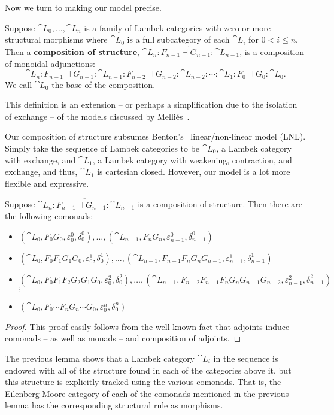 Now we turn to making our model precise.
\begin{definition}
  \label{def:model}  
  Suppose $\cat{L}_0, \ldots, \cat{L}_n$ is a family of Lambek
  categories with zero or more structural morphisms where $\cat{L}_0$
  is a full subcategory of each $\cat{L}_{i}$ for $0 < i \leq n$.  Then a \textbf{composition of structure},
  $\overleftarrow{\cat{L}_n : F_{n-1} \dashv G_{n-1} : \cat{L}_{n-1}}$, is a composition of monoidal adjunctions:
  \[ \cat{L}_n : F_{n-1} \dashv G_{n-1} : \cat{L}_{n-1} : F_{n-2} \dashv G_{n-2} : \cat{L}_{n-2} : \cdots : \cat{L}_1 : F_0 \dashv G_0 : \cat{L}_0. \]
  We call $\cat{L}_0$ the base of the composition.
\end{definition}
This definition is an extension -- or perhaps a simplification due to
the isolation of exchange -- of the models discussed by
Melli\'es~\cite{MELLIES2004202}.

Our composition of structure subsumes Benton's~\cite{Benton:1994}
linear/non-linear model (LNL).  Simply take the sequence of Lambek
categories to be $\cat{L}_0$, a Lambek category with exchange, and
$\cat{L}_1$, a Lambek category with weakening, contraction, and
exchange, and thus, $\cat{L}_1$ is cartesian closed.  However, our
model is a lot more flexible and expressive.

\begin{lemma}
  \label{lemma:comonads_in_a_composition_of_structure}
  Suppose $\overleftarrow{\cat{L}_n : F_{n-1} \dashv G_{n-1} : \cat{L}_{n-1}}$ is a composition of structure.  Then
  there are the following comonads:  
  \begin{itemize}
  \item $(\cat{L}_0, F_0G_0, \varepsilon^0_0, \delta^0_0), \ldots, (\cat{L}_{n-1}, F_nG_n, \varepsilon^0_{n-1}, \delta^0_{n-1})$
  \item $(\cat{L}_0, F_0F_1G_1G_0, \varepsilon^1_0, \delta^1_0), \ldots, (\cat{L}_{n-1}, F_{n-1}F_nG_nG_{n-1}, \varepsilon^1_{n-1}, \delta^1_{n-1})$
  \item $(\cat{L}_0, F_0F_1F_2G_2G_1G_0, \varepsilon^2_0, \delta^2_0), \ldots, (\cat{L}_{n-1}, F_{n-2}F_{n-1}F_nG_nG_{n-1}G_{n-2}, \varepsilon^2_{n-1}, \delta^2_{n-1})$\\
    $\vdots$
  \item $(\cat{L}_0, F_0 \cdots F_nG_n \cdots G_0, \varepsilon^n_0, \delta^n_0)$
  \end{itemize} 
\end{lemma}
\begin{proof}
  This proof easily follows from the well-known fact that adjoints
  induce comonads -- as well as monads -- and composition of adjoints.
\end{proof}
The previous lemma shows that a Lambek category $\cat{L}_i$ in the
sequence is endowed with all of the structure found in each of the
categories above it, but this structure is explicitly tracked using
the various comonads.  That is, the Eilenberg-Moore category of each of the
comonads mentioned in the previous lemma has the corresponding
structural rule as morphisms.

